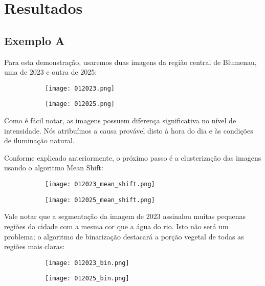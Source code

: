 \documentclass{article}
\begin{document}
\section{Resultados}

\subsection{Exemplo A}

Para esta demonstração, usaremos duas imagens da região central de Blumenau, uma de 2023 e outra de 2025:

\begin{figure}[H]
    \centering
    \begin{subfigure}[b]{0.48\textwidth}
        \texttt{[image: 012023.png]}
        \label{2023}
    \end{subfigure}
    \hfill %
    \begin{subfigure}[b]{0.48\textwidth}
        \texttt{[image: 012025.png]}
        \label{2025}
    \end{subfigure}
    \label{original}
\end{figure}

Como é fácil notar, as imagens possuem diferença significativa no nível de intensidade. Nós atribuímos a causa provável disto à hora do dia e às condições de iluminação natural.

Conforme explicado anteriormente, o próximo passo é a clusterização das imagens usando o algoritmo Mean Shift:

\begin{figure}[H]
    \centering
    \begin{subfigure}[b]{0.48\textwidth}
        \texttt{[image: 012023\_mean\_shift.png]}
        \label{2023}
    \end{subfigure}
    \hfill %
    \begin{subfigure}[b]{0.48\textwidth}
        \texttt{[image: 012025\_mean\_shift.png]}
        \label{2025}
    \end{subfigure}
    \label{segmentada}
\end{figure}

Vale notar que a segmentação da imagem de 2023 assinalou muitas pequenas regiões da cidade com a mesma cor que a água do rio. Isto não será um problema; o algoritmo de binarização destacará a porção vegetal de todas as regiões mais claras:

\begin{figure}[H]
    \centering
    \begin{subfigure}[b]{0.48\textwidth}
        \texttt{[image: 012023\_bin.png]}
        \label{2023}
    \end{subfigure}
    \hfill %
    \begin{subfigure}[b]{0.48\textwidth}
        \texttt{[image: 012025\_bin.png]}
        \label{2025}
    \end{subfigure}
    \label{binarizada}
\end{figure}
\end{document}
